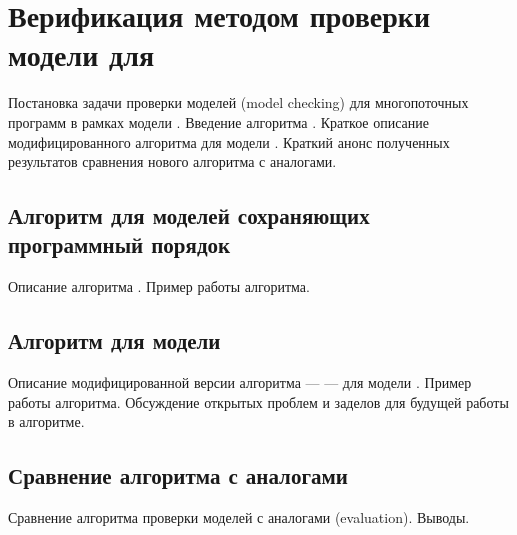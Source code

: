 \chapter{Верификация методом проверки модели для \WkmS}
\label{ch:mc-weakestmo2}

Постановка задачи проверки моделей (model checking)
для многопоточных программ в рамках модели \WkmS.
Введение алгоритма \genmc.
Краткое описание модифицированного алгоритма \genmc
для модели \WkmS.
Краткий анонс полученных результатов сравнения нового алгоритма
с аналогами. 

\section{Алгоритм \genmc для моделей сохраняющих программный порядок}

Описание алгоритма \genmc. Пример работы алгоритма. 

\section{Алгоритм \wmc для модели \WkmS}

Описание модифицированной версии алгоритма \genmc --- \wmc ---
для модели \WkmS. Пример работы алгоритма.
Обсуждение открытых проблем и заделов
для будущей работы в алгоритме. 

\section{Сравнение алгоритма \wmc с аналогами}

Сравнение алгоритма проверки моделей с аналогами (evaluation). Выводы. 
